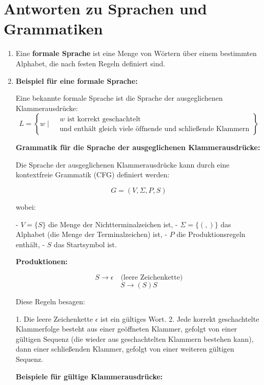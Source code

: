 \documentclass{article}
\begin{document}



\section*{Antworten zu Sprachen und Grammatiken}
\begin{enumerate}
	\item Eine \textbf{formale Sprache} ist eine Menge von Wörtern über einem bestimmten Alphabet, die nach festen Regeln definiert sind.
	\item \textbf{Beispiel für eine formale Sprache:}
	
	Eine bekannte formale Sprache ist die Sprache der ausgeglichenen Klammerausdrücke:
	\[
	L = \left\{ w \mid 
	\begin{aligned}
		& w \text{ ist korrekt geschachtelt} \\
		& \text{und enthält gleich viele öffnende und schließende Klammern}
	\end{aligned}
	\right\}
	\]
	
	\textbf{Grammatik für die Sprache der ausgeglichenen Klammerausdrücke:}
	
	Die Sprache der ausgeglichenen Klammerausdrücke kann durch eine kontextfreie Grammatik (CFG) definiert werden:
	
	\[
	G = (V, \Sigma, P, S)
	\]
	
	wobei:
	
	- \( V = \{S\} \) die Menge der Nichtterminalzeichen ist,
	- \( \Sigma = \{ (, ) \} \) das Alphabet (die Menge der Terminalzeichen) ist,
	- \( P \) die Produktionsregeln enthält,
	- \( S \) das Startsymbol ist.
	
	\textbf{Produktionen:}
	
	\[
	S \to \epsilon \quad \text{(leere Zeichenkette)}
	\]
	\[
	S \to (S)S
	\]
	
	Diese Regeln besagen:
	
	1. Die leere Zeichenkette \(\epsilon\) ist ein gültiges Wort.
	2. Jede korrekt geschachtelte Klammerfolge besteht aus einer geöffneten Klammer, gefolgt von einer gültigen Sequenz (die wieder aus geschachtelten Klammern bestehen kann), dann einer schließenden Klammer, gefolgt von einer weiteren gültigen Sequenz.
	
	\textbf{Beispiele für gültige Klammerausdrücke:}
	

\end{enumerate}
\end{document}
